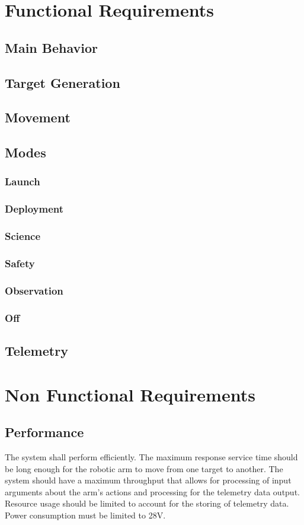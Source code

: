 \documentclass[letterpaper,10pt]{article}
\begin{document}
\section{Functional Requirements}
\subsection{Main Behavior}
\subsection{Target Generation}
\subsection{Movement}
\subsection{Modes}
\subsubsection{Launch}
\subsubsection{Deployment}
\subsubsection{Science}
\subsubsection{Safety}
\subsubsection{Observation}
\subsubsection{Off}
\subsection{Telemetry}

\section{Non Functional Requirements}
\subsection{Performance}
The system shall perform efficiently. The maximum response service time should be long enough for the robotic arm to move from one target to another.
 The system should have a maximum throughput that allows for processing of input arguments about the arm's actions and processing for the telemetry data output. 
 Resource usage should be limited to account for the storing of telemetry data. Power consumption must be limited to 28V.
\end{document}
